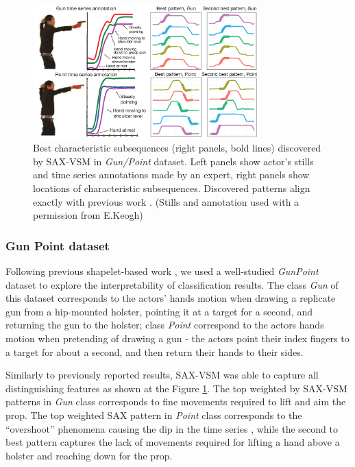 \documentclass[conference]{IEEEtran}
\begin{document}
\begin{figure}[b]
   \centering
   \vspace{0.28cm}
   \includegraphics[width=87mm]{figures/gun-point.eps}
   \caption{Best characteristic subsequences (right panels, bold lines) discovered by 
   SAX-VSM in \textit{Gun/Point} dataset. 
   Left panels show actor's stills and time series annotations made by an expert, 
   right panels show locations of characteristic subsequences.
   Discovered patterns align exactly with previous work \cite{shapelet} \cite{bagnal}.
   (Stills and annotation used with a permission from E.Keogh) }
   \label{fig:shapelet-like-patterns}
   \vspace{-0.45cm}
\end{figure}

\subsubsection{Gun Point dataset}
Following previous shapelet-based work \cite{shapelet} \cite{bagnal}, 
we used a well-studied \textit{GunPoint} dataset \cite{gun} to explore the 
interpretability of classification results. The class \textit{Gun} of this dataset 
corresponds to the actors' hands motion when drawing a replicate gun from 
a hip-mounted holster, pointing it at a target for a second, and returning the 
gun to the holster; class \textit{Point} correspond to the actors hands motion 
when pretending of drawing a gun - the actors point their index fingers to 
a target for about a second, and then return their hands to their sides. 

Similarly to previously reported results, SAX-VSM was able to capture all 
distinguishing features as shown at the Figure \ref{fig:shapelet-like-patterns}. 
The top weighted by SAX-VSM patterns in \textit{Gun} class corresponds 
to fine movements required to lift and aim the prop. 
The top weighted SAX pattern in \textit{Point} class corresponds to the 
``overshoot'' phenomena causing the dip in the time series \cite{gun}, 
while the second to best pattern captures the lack of movements
required for lifting a hand above a holster and reaching down for the prop. 
\end{document}
